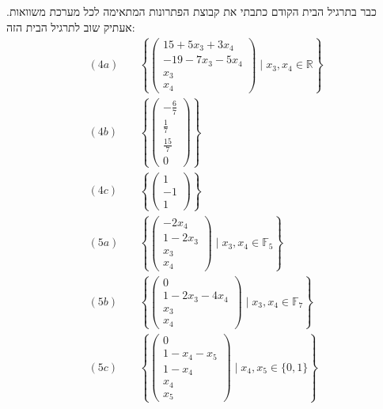 \documentclass[]{article}
\newcommand\R     {\mathbb{R}}
\newcommand\F         {\mathbb{F}}
\newcommand\pms[1]    {\begin{pmatrix}
		#1
\end{pmatrix}}
\newcommand\ccb[1]    {\left \{ #1 \right \}}
\theoremstyle{definition}
\begin{document}
	\section{}
	כבר בתרגיל הבית הקודם כתבתי את קבוצת הפתרונות המתאימה לכל מערכת משוואות. אעתיק שוב לתרגיל הבית הזה: 
	\begin{align*}
		(4a) \quad & \ccb{\pms{15 + 5x_3 + 3x_4 \\ -19 - 7x_3 - 5x_4 \\ x_3 \\ x_4} \mid x_3, x_4 \in \R} \\
		(4b) \quad & \ccb{\pms{-\frac{6}{7} \\ \frac{1}{7} \\ \frac{15}{7} \\ 0}} \\
		(4c) \quad & \ccb{\pms{1 \\ -1 \\ 1}} \\
		(5a) \quad & \ccb{\pms{- 2x_4 \\ 1 - 2x_3 \\ x_3 \\ x_4}\mid x_3, x_4 \in \F_5} \\
		(5b) \quad & \ccb{\pms{0 \\ 1 - 2x_3 - 4x_4\\ x_3 \\ x_4} \mid x_3, x_4 \in \F_7}  \\
		(5c) \quad & \ccb{\pms{0 \\ 1 - x_4 - x_5 \\ 1 - x_4 \\ x_4 \\ x_5} \mid x_4, x_5 \in \{0, 1\}}
	\end{align*}
	
\end{document}
